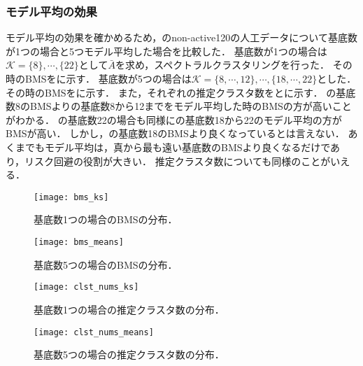 \subsubsection{モデル平均の効果}
モデル平均の効果を確かめるため，のnon-active120の人工データについて基底数が1つの場合と5つモデル平均した場合を比較した．
基底数が1つの場合は$\mathcal{K} = \{8\}, \cdots, \{22\}$として$\bar{A}$を求め，スペクトラルクラスタリングを行った．
その時のBMSをに示す．
基底数が5つの場合は$\mathcal{K} = \{8, \cdots, 12\}, \cdots, \{18, \cdots, 22\}$とした．
その時のBMSをに示す．
また，それぞれの推定クラスタ数をとに示す．
の基底数8のBMSよりの基底数8から12までをモデル平均した時のBMSの方が高いことがわかる．
の基底数22の場合も同様にの基底数18から22のモデル平均の方がBMSが高い．
しかし，の基底数18のBMSより良くなっているとは言えない．
あくまでもモデル平均は，真から最も遠い基底数のBMSより良くなるだけであり，リスク回避の役割が大きい．
推定クラスタ数についても同様のことがいえる．

\begin{figure}[htbp]
    \begin{minipage}{0.5\hsize}
			\begin{center}
					\texttt{[image: bms\_ks]}
					\caption{基底数1つの場合のBMSの分布．}
					\label{fig:bms_ks}
			\end{center}
		\end{minipage}
    \begin{minipage}{0.5\hsize}
			\begin{center}
					\texttt{[image: bms\_means]}
					\caption{基底数5つの場合のBMSの分布．}
					\label{fig:bms_means}
			\end{center}
		\end{minipage}
\end{figure}
\begin{figure}[htbp]
    \begin{minipage}{0.5\hsize}
			\begin{center}
					\texttt{[image: clst\_nums\_ks]}
					\caption{基底数1つの場合の推定クラスタ数の分布．}
					\label{fig:clst_nums_ks}
			\end{center}
		\end{minipage}
    \begin{minipage}{0.5\hsize}
			\begin{center}
					\texttt{[image: clst\_nums\_means]}
					\caption{基底数5つの場合の推定クラスタ数の分布．}
					\label{fig:clst_nums_means}
			\end{center}
		\end{minipage}
\end{figure}
